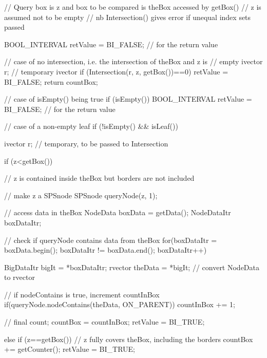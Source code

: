 \begin{DoxyCode}
   {
      // Query box is z and box to be compared is theBox accessed by getBox()
      // z is assumed not to be empty
      // nb Intersection() gives error if unequal index sets passed
         
      BOOL_INTERVAL retValue = BI_FALSE; // for the return value
        
      // case of no intersection, i.e. the intersection of theBox and z is
      // empty 
        ivector r; // temporary ivector
         if (Intersection(r, z, getBox())==0){
            retValue = BI_FALSE;
            return countBox; 
         }        
  
         // case of isEmpty() being true
         if (isEmpty()){
         BOOL_INTERVAL retValue = BI_FALSE; // for the return value
         }
 
         // case of a non-empty leaf
         if (!isEmpty() && isLeaf()) {           
            ivector r; // temporary, to be passed to Intersection              
         
            if (z<getBox()) {
            // z is contained inside theBox but borders are not included
             
               // make z a SPSnode
               SPSnode queryNode(z, 1);
  
               // access data in theBox
               NodeData boxData = getData();
               NodeDataItr boxDataItr;
                 
               // check if queryNode contains data from theBox
               for(boxDataItr = boxData.begin(); boxDataItr != boxData.end(); 
      boxDataItr++){
                  BigDataItr bigIt = *boxDataItr; 
                  rvector theData = *bigIt;  // convert NodeData to rvector
                    
                  // if nodeContains is true, increment countInBox
                  if(queryNode.nodeContains(theData, ON_PARENT)){
                     countInBox += 1;
                  }
               }                             
                 
                // final count;
                countBox = countInBox;
                retValue = BI_TRUE;
            } 
          
            else if (z==getBox()) {
            // z fully covers theBox, including the borders
               countBox += getCounter();
               retValue = BI_TRUE;
            }
       
}}
\end{DoxyCode}
